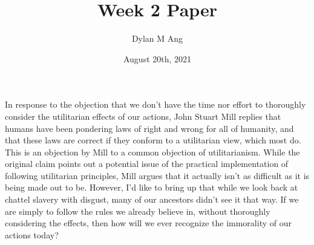 \documentclass[12pt]{article}
\title{Week 2 Paper}
\author{Dylan M Ang}
\date{August 20th, 2021}
\begin{document}
\maketitle

In response to the objection that we don't have the time nor effort to thoroughly consider the utilitarian effects of our actions, John Stuart Mill replies that humans have been pondering laws of right and wrong for all of humanity, and that these laws are correct if they conform to a utilitarian view, which most do.
This is an objection by Mill to a common objection of utilitarianism. While the original claim points out a potential issue of the practical implementation of following utilitarian principles, Mill argues that it actually isn't as difficult as it is being made out to be.
However, I'd like to bring up that while we look back at chattel slavery with disgust, many of our ancestors didn't see it that way. If we are simply to follow the rules we already believe in, without thoroughly considering the effects, then how will we ever recognize the immorality of our actions today?
\end{document}
